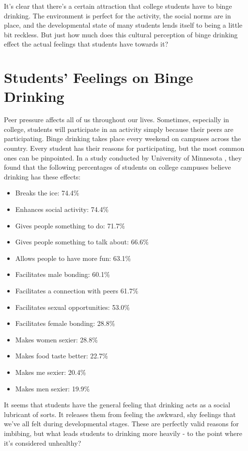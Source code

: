 \documentclass[12pt, man]{apa6}
\begin{document}
It's clear that there's a certain attraction that college students have to binge drinking. The environment is perfect for the activity, the social norms are in place, and the developmental state of many students lends itself to being a little bit reckless. But just how much does this cultural perception of binge drinking effect the actual feelings that students have towards it?

\section{Students' Feelings on Binge Drinking}
Peer pressure affects all of us throughout our lives. Sometimes, especially in college, students will participate in an activity simply because their peers are participating. Binge drinking takes place every weekend on campuses across the country. Every student has their reasons for participating, but the most common ones can be pinpointed. In a study conducted by University of Minnesota , they found that the following percentages of students on college campuses believe drinking has these effects:
\begin{itemize}
	\item Breaks the ice: 74.4\%
	\item Enhances social activity: 74.4\%
	\item Gives people something to do: 71.7\%
	\item Gives people something to talk about: 66.6\%
	\item Allows people to have more fun: 63.1\%
	\item Facilitates male bonding: 60.1\%
	\item Facilitates a connection with peers 61.7\%
	\item Facilitates sexual opportunities: 53.0\%
	\item Facilitates female bonding: 28.8\%
	\item Makes women sexier: 28.8\%
	\item Makes food taste better: 22.7\%
	\item Makes me sexier: 20.4\%
	\item Makes men sexier: 19.9\%
\end{itemize}

It seems that students have the general feeling that drinking acts as a social lubricant of sorts. It releases them from feeling the awkward, shy feelings that we've all felt during developmental stages. These are perfectly valid reasons for imbibing, but what leads students to drinking more heavily - to the point where it's considered unhealthy?
\end{document}
